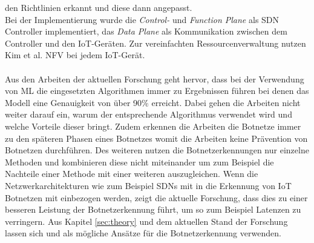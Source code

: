 den Richtlinien erkannt und diese dann angepasst. \\ Bei der Implementierung wurde die \textit{Control-} und \textit{Function Plane} als SDN Controller implementiert, das \textit{Data Plane} als Kommunikation 
zwischen dem Controller und den IoT-Geräten. Zur vereinfachten Ressourcenverwaltung nutzen Kim et al. NFV bei jedem IoT-Gerät. \\ \\ Aus den Arbeiten der aktuellen Forschung geht hervor, dass bei der Verwendung 
von ML die eingesetzten Algorithmen immer zu Ergebnissen führen bei denen das Modell eine Genauigkeit von über 90\% erreicht. Dabei gehen die Arbeiten nicht weiter darauf ein, warum der entsprechende Algorithmus
verwendet wird und welche Vorteile dieser bringt. Zudem erkennen die Arbeiten die Botnetze immer zu den späteren Phasen eines Botnetzes womit die Arbeiten keine Prävention von Botnetzen durchführen. Des weiteren
nutzen die Botnetzerkennungen nur einzelne Methoden und kombinieren diese nicht miteinander um zum Beispiel die Nachteile einer Methode mit einer weiteren auszugleichen. Wenn die Netzwerkarchitekturen wie 
zum Beispiel SDNs mit in die Erkennung von IoT Botnetzen mit einbezogen werden, zeigt die aktuelle Forschung, dass dies zu einer besseren Leistung der Botnetzerkennung führt, um so zum Beispiel Latenzen zu verringern.
Aus Kapitel \ref{sec:theory} und dem aktuellen Stand der Forschung lassen sich \cite{Xing2021SurveyOB} und \cite{Wazzan2021InternetOT} als mögliche Ansätze für die Botnetzerkennung verwenden.
